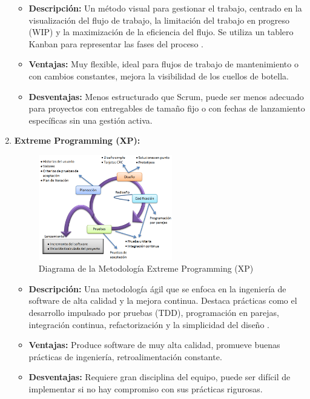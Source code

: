 \begin{enumerate}
    \begin{itemize}
        \item \textbf{Descripción:} Un método visual para gestionar el trabajo, centrado en la visualización del flujo de trabajo, la limitación del trabajo en progreso (WIP) y la maximización de la eficiencia del flujo. Se utiliza un tablero Kanban para representar las fases del proceso \cite{studocu2024agiles}.
        \item \textbf{Ventajas:} Muy flexible, ideal para flujos de trabajo de mantenimiento o con cambios constantes, mejora la visibilidad de los cuellos de botella.
        \item \textbf{Desventajas:} Menos estructurado que Scrum, puede ser menos adecuado para proyectos con entregables de tamaño fijo o con fechas de lanzamiento específicas sin una gestión activa.
    \end{itemize}

\clearpage

    \item \textbf{Extreme Programming (XP):}

    \begin{figure}[H]
        \begin{center}
            \includegraphics[width = 0.55\textwidth]{Figuras/extremeprogramming.png}
        \end{center}
        \caption{\label{fig:extremeprogramming} Diagrama de la Metodología Extreme Programming (XP)}
    \end{figure}

    \begin{itemize}
        \item \textbf{Descripción:} Una metodología ágil que se enfoca en la ingeniería de software de alta calidad y la mejora continua. Destaca prácticas como el desarrollo impulsado por pruebas (TDD), programación en parejas, integración continua, refactorización y la simplicidad del diseño \cite{studocu2024agiles}.
        \item \textbf{Ventajas:} Produce software de muy alta calidad, promueve buenas prácticas de ingeniería, retroalimentación constante.
        \item \textbf{Desventajas:} Requiere gran disciplina del equipo, puede ser difícil de implementar si no hay compromiso con sus prácticas rigurosas.
    \end{itemize}

\end{enumerate}

